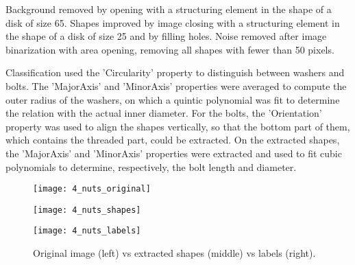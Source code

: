 Background removed by opening with a structuring element in the shape of a disk of size 65. Shapes improved by image closing with a structuring element in the shape of a disk of size 25 and by filling holes. Noise removed after image binarization with area opening, removing all shapes with fewer than 50 pixels.

Classification used the 'Circularity' property to distinguish between washers and bolts. The 'MajorAxis' and 'MinorAxis' properties were averaged to compute the outer radius of the washers, on which a quintic polynomial was fit to determine the relation with the actual inner diameter. For the bolts, the 'Orientation' property was used to align the shapes vertically, so that the bottom part of them, which contains the threaded part, could be extracted. On the extracted shapes, the 'MajorAxis' and 'MinorAxis' properties were extracted and used to fit cubic polynomials to determine, respectively, the bolt length and diameter.

\begin{figure}[h]
\centering
\begin{minipage}{0.3\textwidth}
\texttt{[image: 4\_nuts\_original]}
\end{minipage}
\begin{minipage}{0.3\textwidth}
\texttt{[image: 4\_nuts\_shapes]}
\end{minipage}
\begin{minipage}{0.3\textwidth}
\texttt{[image: 4\_nuts\_labels]}
\end{minipage}
\caption{Original image (left) vs extracted shapes (middle) vs labels (right).}
\end{figure}
